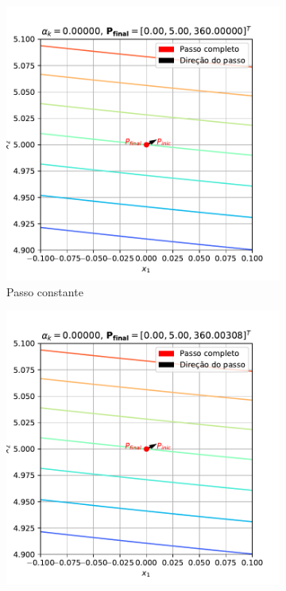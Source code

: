\documentclass[10pt, a4paper]{article}
\begin{document}
\begin{figure}[htpb]
  \centering
  \begin{subfigure}[b]{0.32\textwidth}
      \centering
      \includegraphics[width=\textwidth]{images/q2c_1.pdf}
      \caption{Passo constante}
      \label{fig:q2c_1}
  \end{subfigure}
  \hfill
  \begin{subfigure}[b]{0.32\textwidth}
      \centering
      \includegraphics[width=\textwidth]{images/q2c_2.pdf}

\end{subfigure}
\end{figure}
\end{document}
